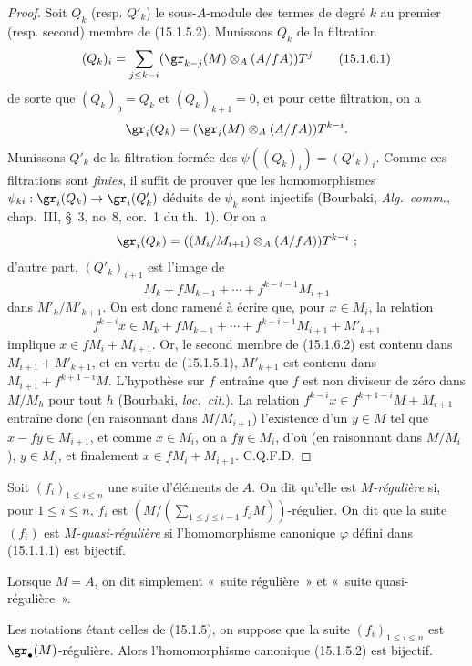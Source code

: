 \begin{proof}
Soit $Q_k$ (resp. $Q'_k$) le sous-$A$-module des termes de degré $k$ au
premier (resp. second) membre de (15.1.5.2). Munissons $Q_k$ de la filtration
\[
  (Q_k)_i=\sum_{j\leq k-i}
  (\gr_{k-j}(M)\otimes_A(A/fA))T^j
  \tag{15.1.6.1}\label{0.15.1.6.1-fr}
\]
de sorte que $(Q_k)_0=Q_k$ et $(Q_k)_{k+1}=0$, et pour cette filtration, on a
\[
  \gr_i(Q_k)=(\gr_i(M)\otimes_A(A/fA))T^{k-i}.
\]
Munissons $Q'_k$ de la filtration formée des
$\psi((Q_k)_i)=(Q'_k)_i$. Comme ces filtrations sont \emph{finies}, il suffit
de prouver que les homomorphismes
$\psi_{ki}:\gr_i(Q_k)\to\gr_i(Q'_k)$ déduits de $\psi_k$ sont injectifs
(Bourbaki, \emph{Alg.~comm.}, chap.~III, \S~3, no~8, cor.~1 du th.~1). Or on
a
\[
  \gr_i(Q_k)=((M_i/M_{i+1})\otimes_A(A/fA))T^{k-i}~;
\]
d'autre part, $(Q'_k)_{i+1}$ est l'image de
\[
  M_k+fM_{k-1}+\cdots+f^{k-i-1}M_{i+1}
\]
dans $M'_k/M'_{k+1}$. On est donc ramené à écrire que, pour $x\in M_i$, la
relation
\[
  f^{k-i}x\in M_k+fM_{k-1}+\cdots+
  f^{k-i-1}M_{i+1}+M'_{k+1}
  \tag{15.1.6.2}\label{0.15.1.6.2-fr}
\]
implique $x\in fM_i+M_{i+1}$. Or, le second membre de (15.1.6.2) est contenu
dans $M_{i+1}+M'_{k+1}$, et en vertu de (15.1.5.1), $M'_{k+1}$ est contenu
dans $M_{i+1}+f^{k+1-i}M$. L'hypothèse sur $f$ entraîne que $f$ est non
diviseur de zéro dans $M/M_h$ pour tout $h$ (Bourbaki, \emph{loc.~cit.}). La
relation $f^{k-i}x\in f^{k+1-i}M+M_{i+1}$ entraîne donc (en raisonnant dans
$M/M_{i+1}$) l'existence d'un $y\in M$ tel que $x-fy\in M_{i+1}$, et comme
$x\in M_i$, on a $fy\in M_i$, d'où (en raisonnant dans $M/M_i$), $y\in M_i$,
et finalement $x\in fM_i+M_{i+1}$. C.Q.F.D.
\end{proof}

\begin{definition}[15.1.7]
\label{0.15.1.7-fr}
Soit $(f_i)_{1\leq i\leq n}$ une suite d'éléments de $A$. On dit qu'elle est
\emph{$M$-régulière} si, pour $1\leq i\leq n$, $f_i$ est
$\left(M/(\sum_{1\leq j\leq i-1}f_jM)\right)$-régulier. On dit que la suite
$(f_i)$ est \emph{$M$-quasi-régulière} si
l'homomorphisme canonique $\varphi$ défini dans (15.1.1.1) est bijectif.

Lorsque $M=A$, on dit simplement «~suite régulière~» et
«~suite quasi-régulière~».
\end{definition}

\begin{proposition}[15.1.8]
\label{0.15.1.8-fr}
Les notations étant celles de (15.1.5), on suppose que la suite
$(f_i)_{1\leq i\leq n}$ est $\gr_\bullet(M)$-régulière. Alors
l'homomorphisme canonique (15.1.5.2) est bijectif.
\end{proposition}

